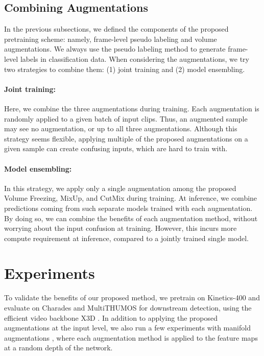 \documentclass[10pt,twocolumn,letterpaper]{article}
\begin{document}
\vspace{-1mm}
\subsection{Combining Augmentations}
\vspace{-1mm}

In the previous subsections, we defined the components of the proposed pretraining scheme: namely, frame-level pseudo labeling and volume augmentations. We always use the pseudo labeling method to generate frame-level labels in classification data. When considering the augmentations, we try two strategies to combine them: (1) joint training and (2) model ensembling.

\vspace{-1mm}
\paragraph{Joint training:} Here, we combine the three augmentations during training. Each augmentation is randomly applied to a given batch of input clips. Thus, an augmented sample may see no augmentation, or up to all three augmentations. Although this strategy seems flexible, applying multiple of the proposed augmentations on a given sample can create confusing inputs, which are hard to train with.

\vspace{-1mm}
\paragraph{Model ensembling:} In this strategy, we apply only a single augmentation among the proposed Volume Freezing, MixUp, and CutMix during training. At inference, we combine predictions coming from such separate models trained with each augmentation. By doing so, we can combine the benefits of each augmentation method, without worrying about the input confusion at training. However, this incurs more compute requirement at inference, compared to a jointly trained single model.

\vspace{-2mm}



\section{Experiments}
\label{sec:results}
\vspace{-1mm}

To validate the benefits of our proposed method, we pretrain on Kinetics-400 \cite{carreira2017quo} and evaluate on Charades \cite{sigurdsson2016hollywood} and MultiTHUMOS \cite{yeung2018every} for downstream detection, using the efficient video backbone X3D \cite{feichtenhofer2020x3d}. In addition to applying the proposed augmentations at the input level, we also run a few experiments with manifold augmentations \cite{verma2019manifold}, where each augmentation method is applied to the feature maps at a random depth of the network.
\end{document}
